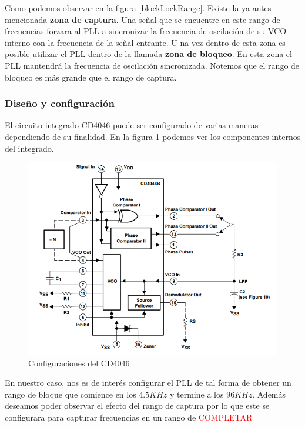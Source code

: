 Como podemos observar en la figura \ref{blockLockRange}. Existe la ya antes mencionada \textbf{zona de captura}. Una señal que se encuentre en este rango de frecuencias forzara al PLL a sincronizar la frecuencia de oscilación de su VCO interno con la frecuencia de la señal entrante. U na vez dentro de esta zona es posible utilizar el PLL dentro de la llamada \textbf{zona de bloqueo}. En esta zona el PLL mantendrá la frecuencia de oscilación sincronizada. Notemos que el rango de bloqueo es más grande que el rango de captura.

\subsubsection{Diseño y configuración}
El circuito integrado CD4046 puede ser configurado de varias maneras dependiendo de su finalidad.
En la figura \ref{configuraciones} podemos ver los componentes internos del integrado. 

\begin{figure}[H]
	\centering
	\includegraphics[scale=0.5]{ImagenesVarias/PLL_innerblockdiagram.png}
	\caption{Configuraciones del CD4046 }
	\label{configuraciones}
\end{figure}

En nuestro caso, nos es de interés configurar el PLL de tal forma de obtener un rango de bloque que comience en los $4.5KHz$ y termine a los $96KHz$. Además deseamos poder observar el efecto del rango de captura por lo que este se configurara para capturar frecuencias en un rango de \textcolor{red}{COMPLETAR} 

